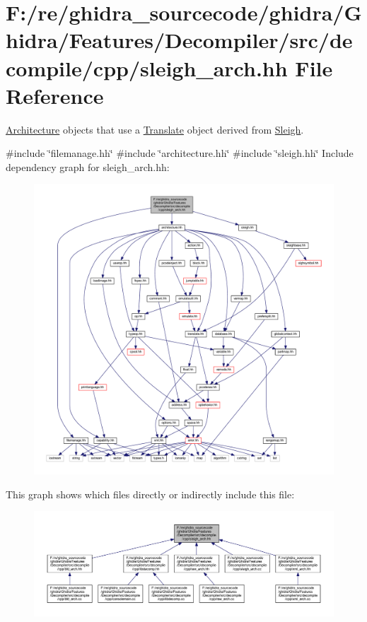 \hypertarget{sleigh__arch_8hh}{}\section{F\+:/re/ghidra\+\_\+sourcecode/ghidra/\+Ghidra/\+Features/\+Decompiler/src/decompile/cpp/sleigh\+\_\+arch.hh File Reference}
\label{sleigh__arch_8hh}


\mbox{\hyperlink{class_architecture}{Architecture}} objects that use a \mbox{\hyperlink{class_translate}{Translate}} object derived from \mbox{\hyperlink{class_sleigh}{Sleigh}}.  


{\ttfamily \#include \char`\"{}filemanage.\+hh\char`\"{}}\newline
{\ttfamily \#include \char`\"{}architecture.\+hh\char`\"{}}\newline
{\ttfamily \#include \char`\"{}sleigh.\+hh\char`\"{}}\newline
Include dependency graph for sleigh\+\_\+arch.\+hh\+:
\nopagebreak
\begin{figure}[H]
\begin{center}
\leavevmode
\includegraphics[width=350pt]{sleigh__arch_8hh__incl}
\end{center}
\end{figure}
This graph shows which files directly or indirectly include this file\+:
\nopagebreak
\begin{figure}[H]
\begin{center}
\leavevmode
\includegraphics[width=350pt]{sleigh__arch_8hh__dep__incl}
\end{center}
\end{figure}
